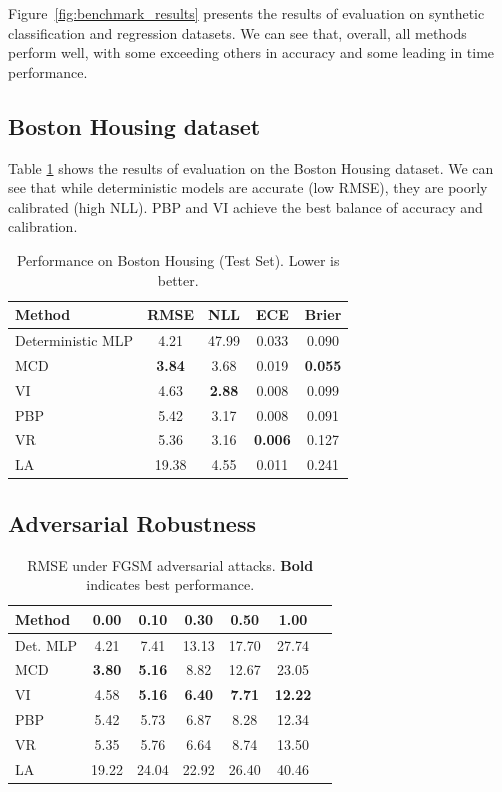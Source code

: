 \documentclass[a4paper,fleqn]{cas-dc}
\begin{document}
Figure~\ref{fig:benchmark_results} presents the results of evaluation on synthetic classification and regression datasets. We can see that, overall, all methods perform well, with some exceeding others in accuracy and some leading in time performance.

\subsection{Boston Housing dataset}
Table \ref{tab:boston_results} shows the results of evaluation on the Boston Housing dataset. We can see that while deterministic models are accurate (low RMSE), they are poorly calibrated (high NLL). PBP and VI achieve the best balance of accuracy and calibration.

\begin{table}[ht]
\centering
\caption{Performance on Boston Housing (Test Set). Lower is better.}
\label{tab:boston_results}
\begin{tabular}{lcccc}
\toprule
\textbf{Method} & \textbf{RMSE} & \textbf{NLL} & \textbf{ECE} & \textbf{Brier} \\
\midrule
Deterministic MLP & 4.21 & 47.99 & 0.033 & 0.090 \\
MCD & \textbf{3.84} & 3.68 & 0.019 & \textbf{0.055} \\
VI & 4.63 & \textbf{2.88} & 0.008 & 0.099 \\
PBP & 5.42 & 3.17 & 0.008 & 0.091 \\
VR & 5.36 & 3.16 & \textbf{0.006} & 0.127 \\
LA & 19.38 & 4.55 & 0.011 & 0.241 \\
\bottomrule
\end{tabular}
\end{table}

\subsection{Adversarial Robustness}
\begin{table}[ht]
\centering
\caption{RMSE under FGSM adversarial attacks. \textbf{Bold} indicates best performance.}
\label{tab:adversarial_rmse}
\begin{tabular}{lcccccc}
\toprule
Method & 0.00 & 0.10 & 0.30 & 0.50 & 1.00 \\
\midrule
Det. MLP & 4.21 & 7.41 & 13.13 & 17.70 & 27.74 \\
MCD & \textbf{3.80} & \textbf{5.16} & 8.82 & 12.67 & 23.05 \\
VI & 4.58 & \textbf{5.16} & \textbf{6.40} & \textbf{7.71} & \textbf{12.22} \\
PBP & 5.42 & 5.73 & 6.87 & 8.28 & 12.34 \\
VR & 5.35 & 5.76 & 6.64 & 8.74 & 13.50 \\
LA & 19.22 & 24.04 & 22.92 & 26.40 & 40.46 \\
\bottomrule
\end{tabular}
\end{table}
\end{document}
